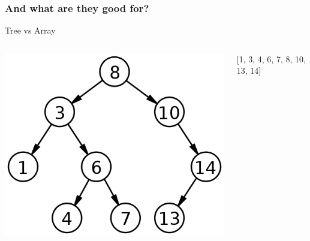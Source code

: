 \documentclass[12pt, xcolor=table]{beamer}
\begin{document}
\begin{frame}
    \frametitle{And what are they good for?}
    \begin{block}{Tree vs Array}
    \begin{columns}
            \begin{center}
            \includegraphics[scale=0.3]{figures/tree.png}
            \end{center}
            \begin{center}
                [1, 3, 4, 6, 7, 8, 10, 13, 14]
            \end{center}
    \end{columns}
\end{block}
\end{frame}
\end{document}
